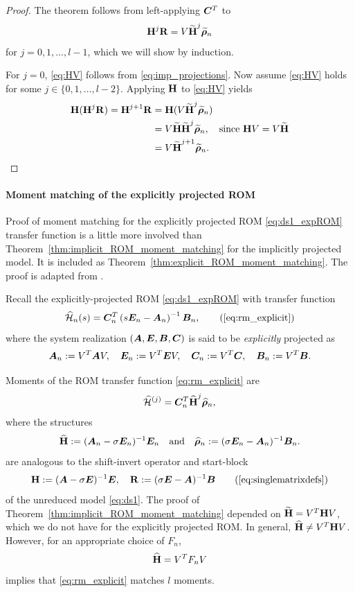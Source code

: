 \begin{proof}
The theorem follows from left-applying $\bm{C}^T$ to 
\begin{equation}
\textbf{\textup{H}}^j \textbf{\textup{R}} = V \widetilde{\textbf{\textup{H}}}^j \widetilde{\boldsymbol{\rho}}_n
\label{eq:HV}
\end{equation}
for $j=0,1,\ldots,l-1$, which we will show by induction.  

For $j=0$, \eqref{eq:HV} follows from \eqref{eq:imp_projections}.  Now assume \eqref{eq:HV} holds for some $j\in \{0,1,\ldots,l-2\}$. Applying $\textbf{\textup{H}}$ to \eqref{eq:HV} yields
\begin{align*}
\textbf{\textup{H}}(\textbf{\textup{H}}^j\textbf{\textup{R}}) = \textbf{\textup{H}}^{j+1} \textbf{\textup{R}} &= \textbf{\textup{H}} (V \widetilde{\textbf{\textup{H}}}^j \widetilde{\boldsymbol{\rho}}_n) \\
&= V \widetilde{\textbf{\textup{H}}} \widetilde{\textbf{\textup{H}}}^j \widetilde{\boldsymbol{\rho}}_n, \quad\text{since } \textbf{\textup{H}} V = V \widetilde{\textbf{\textup{H}}} \\
&=  V \widetilde{\textbf{\textup{H}}}^{j+1} \widetilde{\boldsymbol{\rho}}_n.
\end{align*}
      
\end{proof}

\paragraph{Moment matching of the explicitly projected ROM}
 Proof of moment matching for the explicitly projected ROM \eqref{eq:ds1_expROM} transfer function is a little more involved than Theorem~\ref{thm:implicit_ROM_moment_matching} for the implicitly projected model.   It is included as Theorem~\ref{thm:explicit_ROM_moment_matching}.  The proof is adapted from \cite[proposition 6 and theorem 7]{freund2000b}. 

Recall the explicitly-projected ROM \eqref{eq:ds1_expROM} with transfer function
\[  
\tfexp_n(s) = \CC_n^T\left(s\E_n-\A_n\right)^{-1}\BB_n,
         \tag{\ref{eq:rm_explicit}}
\]
where the system realization $(\bm{A},\bm{E},\bm{B},\bm{C})$ is said to be \emph{explicitly} projected as 
\[
\bm{A}_n := V^T \bm{A} V, \quad \bm{E}_n := V^T \bm{E} V, \quad \bm{C}_n := V^T \bm{C}, \quad \bm{B}_n := V^T\bm{B}.
\]

Moments of the ROM transfer function \eqref{eq:rm_explicit} are
\[
\widehat{\mathcal{H}}^{(j)} =\bm{C}_n^T \widehat{\textbf{\textup{H}}}^j \widehat{\boldsymbol{\rho}}_n, 
\]
where the structures
\begin{equation}
 \widehat{\textbf{\textup{H}}} := (\bm{A}_n - \sigma \bm{E}_n)^{-1}\bm{E}_n\quad\textrm{and}\quad \widehat{\boldsymbol{\rho}}_n := (\sigma \bm{E}_n-\bm{A}_n)^{-1}\bm{B}_n.        
        \label{eq:explict_ROM_op}
\end{equation} 
are analogous  to the shift-invert operator and start-block  
\begin{equation}
                        \H := (\A - \xp \E)^{-1}\E, \quad \RR := (\xp \E-\A)^{-1}\BB        
        \tag{\ref{eq:singlematrixdefs}}
        \end{equation}
of the unreduced model \eqref{eq:ds1}.
The proof of Theorem~\ref{thm:implicit_ROM_moment_matching}
depended on  $\widetilde{\textbf{\textup{H}}}=V^T \textbf{\textup{H}} V$, which we do not have for the explicitly projected ROM.  In general, $\widehat{\textbf{\textup{H}}} \neq V^T \textbf{\textup{H}} V$.
However, for an appropriate choice of $F_n$, 
\[
\widehat{\textbf{\textup{H}}} = V^T F_n V
\]
implies that \eqref{eq:rm_explicit} matches $l$ moments.

